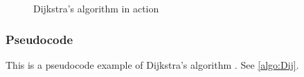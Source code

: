 

  \begin{figure}[ht!]
    \centering
    \caption{Dijkstra's algorithm in action}
    \label{fig:dijkstra}
  \end{figure}

\subsubsection{Pseudocode}

This is a pseudocode example of Dijkstra's algorithm \cite{wiki_dijkstra}. See \cref{algo:Dij}.

